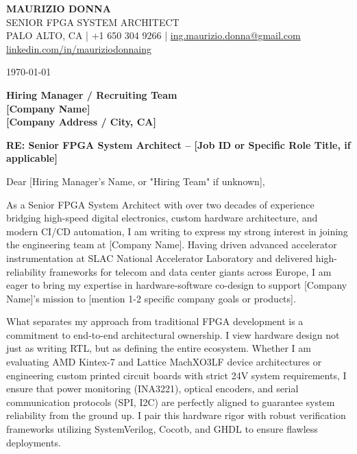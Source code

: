 \documentclass[11pt, letterpaper]{article}
\begin{document}
\begin{center}
    {\LARGE \textbf{MAURIZIO DONNA}}\\[4pt]
    {\large SENIOR FPGA SYSTEM ARCHITECT}\\[4pt]
    PALO ALTO, CA | +1 650 304 9266 | \href{mailto:ing.maurizio.donna@gmail.com}{ing.maurizio.donna@gmail.com}\\
    \href{https://linkedin.com/in/mauriziodonnaing}{linkedin.com/in/mauriziodonnaing}
\end{center}

\vspace{3em} %

\today %

\vspace{2em}

\noindent
\textbf{Hiring Manager / Recruiting Team}\\
\textbf{[Company Name]}\\
\textbf{[Company Address / City, CA]}

\vspace{1.5em}

\noindent
\textbf{RE: Senior FPGA System Architect -- [Job ID or Specific Role Title, if applicable]}

\vspace{1.5em}

\noindent
Dear [Hiring Manager's Name, or "Hiring Team" if unknown],

As a Senior FPGA System Architect with over two decades of experience bridging high-speed digital electronics, custom hardware architecture, and modern CI/CD automation, I am writing to express my strong interest in joining the engineering team at [Company Name]. Having driven advanced accelerator instrumentation at SLAC National Accelerator Laboratory and delivered high-reliability frameworks for telecom and data center giants across Europe, I am eager to bring my expertise in hardware-software co-design to support [Company Name]'s mission to [mention 1-2 specific company goals or products].

What separates my approach from traditional FPGA development is a commitment to end-to-end architectural ownership. I view hardware design not just as writing RTL, but as defining the entire ecosystem. Whether I am evaluating AMD Kintex-7 and Lattice MachXO3LF device architectures or engineering custom printed circuit boards with strict 24V system requirements, I ensure that power monitoring (INA3221), optical encoders, and serial communication protocols (SPI, I2C) are perfectly aligned to guarantee system reliability from the ground up. I pair this hardware rigor with robust verification frameworks utilizing SystemVerilog, Cocotb, and GHDL to ensure flawless deployments. 
\end{document}
